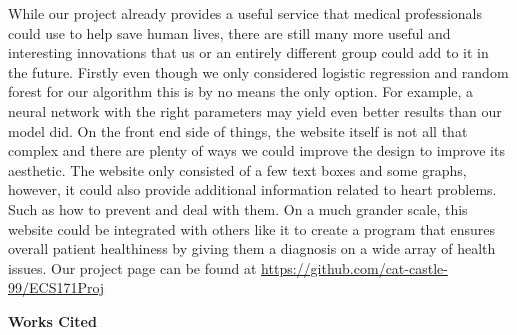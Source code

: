 \documentclass[12pt]{article}
\begin{document}
While our project already provides a useful service that medical professionals could use to help save human lives, there are still many more useful and interesting innovations that us or an entirely different group could add to it in the future. Firstly even though we only considered logistic regression and random forest for our algorithm this is by no means the only option. For example, a neural network with the right parameters may yield even better results than our model did. On the front end side of things, the website itself is not all that complex and there are plenty of ways we could improve the design to improve its aesthetic. The website only consisted of a few text boxes and some graphs, however, it could also provide additional information related to heart problems. Such as how to prevent and deal with them. On a much grander scale, this website could be integrated with others like it to create a program that ensures overall patient healthiness by giving them a diagnosis on a wide array of health issues.
Our project page can be found at \url{https://github.com/cat-castle-99/ECS171Proj}

\newpage
\begin{center}
    \textbf{Works Cited}
\end{center}
\end{document}
